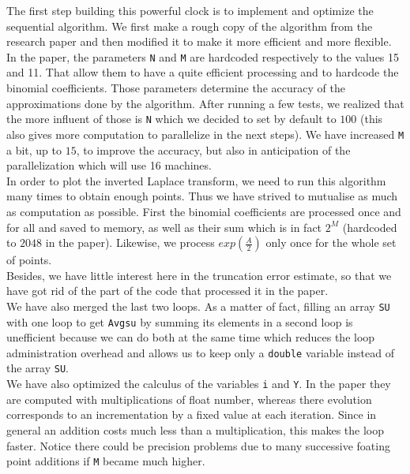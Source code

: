 \documentclass[11pt,a4paper]{article}
\begin{document}
The first step building this powerful clock is to implement and optimize the sequential algorithm. We first make a rough copy of the algorithm from the research paper and then modified it to make it more efficient and more flexible.\\

In the paper, the parameters \verb_N_ and \verb_M_ are hardcoded respectively to the values 15 and 11. That allow them to have a quite efficient processing and to hardcode the binomial coefficients. Those parameters determine the accuracy of the approximations done by the algorithm. After running a few tests, we realized that the more influent of those is \verb_N_ which we decided to set by default to $100$ (this also gives more computation to parallelize in the next steps). We have increased \verb_M_ a bit, up to $15$, to improve the accuracy, but also in anticipation of the parallelization which will use 16 machines.\\

In order to plot the inverted Laplace transform, we need to run this algorithm many times to obtain enough points. Thus we have strived to mutualise as much as computation as possible. First the binomial coefficients are processed once and for all and saved to memory, as well as their sum which is in fact $2^M$ (hardcoded to $2048$ in the paper). Likewise, we process $exp(\frac{A}{2})$ only once for the whole set of points.\\

Besides, we have little interest here in the truncation error estimate, so that we have got rid of the part of the code that processed it in the paper.\\

We have also merged the last two loops. As a matter of fact, filling an array \verb_SU_ with one loop to get \verb_Avgsu_ by summing its elements in a second loop is unefficient because we can do both at the same time which reduces the loop administration overhead and allows us to keep only a \verb_double_ variable instead of the array \verb_SU_.\\

We have also optimized the calculus of the variables \verb_i_ and \verb_Y_. In the paper they are computed with multiplications of float number, whereas there evolution corresponds to an incrementation by a fixed value at each iteration. Since in general an addition costs much less than a multiplication, this makes the loop faster. Notice there could be precision problems due to many successive foating point additions if \verb_M_ became much higher.\\
\end{document}
